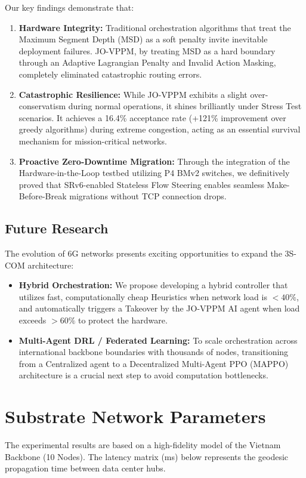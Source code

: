 Our key findings demonstrate that:
\begin{enumerate}
    \item \textbf{Hardware Integrity:} Traditional orchestration algorithms that treat the Maximum Segment Depth (MSD) as a soft penalty invite inevitable deployment failures. JO-VPPM, by treating MSD as a hard boundary through an Adaptive Lagrangian Penalty and Invalid Action Masking, completely eliminated catastrophic routing errors.
    \item \textbf{Catastrophic Resilience:} While JO-VPPM exhibits a slight over-conservatism during normal operations, it shines brilliantly under Stress Test scenarios. It achieves a 16.4\% acceptance rate (+121\% improvement over greedy algorithms) during extreme congestion, acting as an essential survival mechanism for mission-critical networks.
    \item \textbf{Proactive Zero-Downtime Migration:} Through the integration of the Hardware-in-the-Loop testbed utilizing P4 BMv2 switches, we definitively proved that SRv6-enabled Stateless Flow Steering enables seamless Make-Before-Break migrations without TCP connection drops.
\end{enumerate}

\section{Future Research}
The evolution of 6G networks presents exciting opportunities to expand the 3S-COM architecture:
\begin{itemize}
    \item \textbf{Hybrid Orchestration:} We propose developing a hybrid controller that utilizes fast, computationally cheap Heuristics when network load is $<40\%$, and automatically triggers a Takeover by the JO-VPPM AI agent when load exceeds $>60\%$ to protect the hardware.
    \item \textbf{Multi-Agent DRL / Federated Learning:} To scale orchestration across international backbone boundaries with thousands of nodes, transitioning from a Centralized agent to a Decentralized Multi-Agent PPO (MAPPO) architecture is a crucial next step to avoid computation bottlenecks.
\end{itemize}

\appendix
\chapter{Substrate Network Parameters}
\label{appendix:topology}
The experimental results are based on a high-fidelity model of the Vietnam Backbone (10 Nodes). The latency matrix (ms) below represents the geodesic propagation time between data center hubs.

